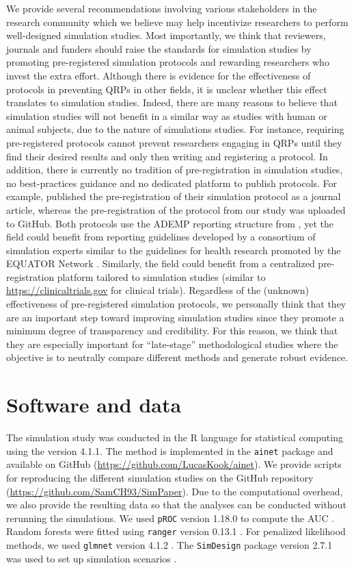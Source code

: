 We provide several recommendations involving various stakeholders in the
research community which we believe may help incentivize researchers to perform
well-designed simulation studies. Most importantly, we think that reviewers,
journals and funders should raise the standards for simulation studies by
promoting pre-registered simulation protocols and rewarding researchers who
invest the extra effort. Although there is evidence for the effectiveness of
protocols in preventing QRPs in other fields, it is unclear whether this effect
translates to simulation studies. Indeed, there are many reasons to believe that
simulation studies will not benefit in a similar way as studies with human or
animal subjects, due to the nature of simulations studies. For instance,
requiring pre-registered protocols cannot prevent researchers engaging in QRPs
until they find their desired results and only then writing and registering a
protocol. In addition, there is currently no tradition of pre-registration in
simulation studies, no best-practices guidance and no dedicated platform to
publish protocols. For example, \citet{Kipruto2022} published the
pre-registration of their simulation protocol as a journal article, whereas the
pre-registration of the protocol from our study was uploaded to GitHub. Both
protocols use the ADEMP reporting structure from \citet{Morris2019}, yet the
field could benefit from reporting guidelines developed by a consortium of
simulation experts similar to the guidelines for health research promoted by the
EQUATOR Network \citep{Altman2008}. Similarly, the field could benefit from a
centralized pre-registration platform tailored to simulation studies (similar to
\url{https://clinicaltrials.gov} for clinical trials). Regardless of the
(unknown) effectiveness of pre-registered simulation protocols, we personally
think that they are an important step toward improving simulation studies since
they promote a minimum degree of transparency and credibility. For this reason,
we think that they are especially important for ``late-stage'' methodological
studies \citep{Heinze2022} where the objective is to neutrally compare different
methods and generate robust evidence.

\section*{Software and data}
The simulation study was conducted in the R language for statistical computing
\citep{R} using the version 4.1.1. The method \ainet{} is implemented in the
\texttt{ainet} package and available on GitHub
(\url{https://github.com/LucasKook/ainet}). We provide scripts for reproducing
the different simulation studies on the GitHub repository
(\url{https://github.com/SamCH93/SimPaper}). Due to the computational overhead,
we also provide the resulting data so that the analyses can be conducted without
rerunning the simulations. We used \texttt{pROC} version 1.18.0 to compute the
AUC \citep{Robin2011}. Random forests were fitted using \texttt{ranger} version
0.13.1 \citep{Wright2017}. For penalized likelihood methods, we used
\texttt{glmnet} version 4.1.2 \citep{Friedman2010,Simon2011}. The
\texttt{SimDesign} package version 2.7.1 was used to set up simulation scenarios
\citep{Chalmers2020}.

